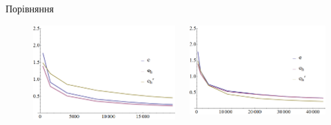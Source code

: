 \begin{frame}{Порівняння}
	\begin{figure}[H]
		\begin{columns}
		 	\begin{column}{0.5\textwidth}
		 		\includegraphics[width=\textwidth]{problem1/my/Plotnb}
		 	 \end{column}
		     \begin{column}{0.5\textwidth}
		     	\includegraphics[width=\textwidth]{problem1/ost/Plotnb}
		     \end{column}
		\end{columns}
	\end{figure}
\end{frame}
